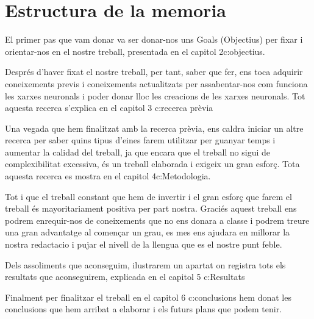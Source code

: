 \section{Estructura de la memoria}

El primer pas que vam donar va ser donar-nos uns Goals (Objectius) per fixar i orientar-nos en el nostre treball, presentada en el capitol 2\refname{c:objectius}.

Després d'haver fixat el nostre treball, per tant, saber que fer, ens toca adquirir coneixements previs i coneixements actualitzats per assabentar-nos com funciona les xarxes neuronals i poder donar lloc les creacions de les xarxes neuronals. Tot aquesta recerca s'explica en el capitol 3 \refname{c:recerca prèvia}

Una vegada que hem finalitzat amb la recerca prèvia, ens caldra iniciar un altre recerca per saber quins tipus d'eines farem utilitzar per guanyar temps i aumentar la calidad del treball, ja que encara que el treball no sigui de complexibilitat excessiva, és un treball elaborada i exigeix un gran esforç. Tota aquesta recerca es mostra en el capitol 4\refname{c:Metodologia}.

Tot i que el treball constant que hem de invertir i el gran esforç que farem el treball és mayoritariament positiva per part nostra. Graciés  aquest treball ens podrem enrequir-nos de coneixements que no ens donara a classe i podrem treure una gran advantatge al començar un grau, es mes ens ajudara en millorar la nostra redactacio i pujar el nivell de la llengua que es el nostre punt feble.

Dels assoliments que aconseguim, ilustrarem un apartat on registra tots els resultats que aconseguirem, explicada en el capitol 5 \refname{c:Resultats}

Finalment per finalitzar el treball en el capitol 6 \refname{c:conclusions} hem donat les conclusions que hem arribat a elaborar i els futurs plans que podem tenir.


